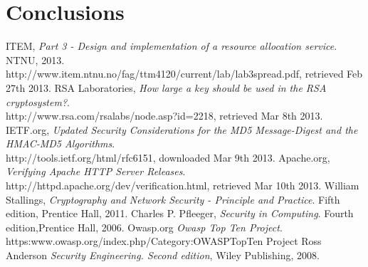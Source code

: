 \documentclass[a4paper,11pt]{article}
\begin{document}
\section{Conclusions}
\begin{thebibliography}{9}
ITEM, 
	\emph{Part 3 - Design and implementation of a resource allocation service}.
	NTNU, 2013. \\http://www.item.ntnu.no/fag/ttm4120/current/lab/lab3spread.pdf, retrieved Feb 27th 2013.
RSA Laboratories, \emph{How large a key should be used in the RSA cryptosystem?}.\\ http://www.rsa.com/rsalabs/node.asp?id=2218, retrieved Mar 8th 2013.	
IETF.org, \emph{Updated Security Considerations for the MD5 Message-Digest and the HMAC-MD5 Algorithms}.\\ http://tools.ietf.org/html/rfc6151, downloaded Mar 9th 2013.
 Apache.org, \emph{Verifying Apache HTTP Server Releases}.\\ http://httpd.apache.org/dev/verification.html, retrieved Mar 10th 2013.
William Stallings, \emph{Cryptography and Network Security - Principle and Practice}. Fifth edition, Prentice Hall, 2011.
Charles P. Pfleeger, \emph{Security in Computing}. Fourth edition,Prentice Hall, 2006.
Owasp.org \emph{Owasp Top Ten Project}.\\ https:www.owasp.org/index.php/Category:OWASP\textunderscore Top\textunderscore Ten \textunderscore Project
Ross Anderson \emph{Security Engineering. Second edition}, Wiley Publishing, 2008.
\end{thebibliography}
\end{document}
